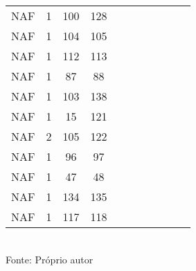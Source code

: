\begin{table}[H]
{\begin{tabular}{ccccccccccc}
NAF & 1 & 100 & 128 &  &  &  &  &  &  &  \\
NAF & 1 & 104 & 105 &  &  &  &  &  &  &  \\
NAF & 1 & 112 & 113 &  &  &  &  &  &  &  \\
NAF & 1 & 87 & 88 &  &  &  &  &  &  &  \\
NAF & 1 & 103 & 138 &  &  &  &  &  &  &  \\
NAF & 1 & 15 & 121 &  &  &  &  &  &  &  \\
NAF & 2 & 105 & 122 &  &  &  &  &  &  &  \\
NAF & 1 & 96 & 97 &  &  &  &  &  &  &  \\
NAF & 1 & 47 & 48 &  &  &  &  &  &  &  \\
NAF & 1 & 134 & 135 &  &  &  &  &  &  &  \\
NAF & 1 & 117 & 118 &  &  &  &  &  &  &  \\
\bottomrule
\end{tabular}}
\\Fonte: Próprio autor
\end{table}


